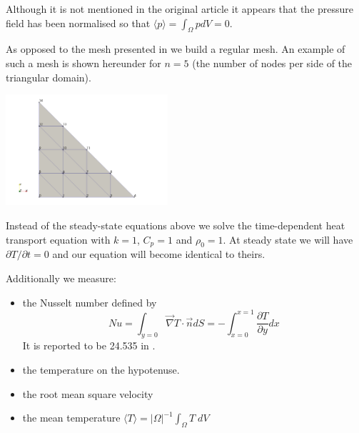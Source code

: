 Although it is not mentioned in the original article it appears that the 
pressure field has been normalised so that $\langle p \rangle = \int_\Omega p dV=0$.

As opposed to the mesh presented in \cite{jolm17} we build a regular mesh.
An example of such a mesh is shown hereunder for $n=5$ (the number of nodes
per side of the triangular domain). 
\begin{center}
\includegraphics[width=6cm]{python_codes/fieldstone_51/images/minigrid5}
\end{center}

Instead of the steady-state equations above we solve the time-dependent 
heat transport equation with $k=1$, $C_p=1$ and $\rho_0=1$. At steady state 
we will have $\partial T/\partial t=0$ and our equation will become identical 
to theirs. 

Additionally we measure:
\begin{itemize}
\item the Nusselt number defined by 
\[
Nu
=\int_{y=0} \vec{\nabla}T \cdot \vec{n} dS  
=-\int_{x=0}^{x=1} \frac{\partial T}{\partial y} dx 
\]
It is reported to be 24.535 in \cite{jolm17}.
\item the temperature on the hypotenuse.
\item the root mean square velocity
\item the mean temperature $\langle T \rangle = |\Omega|^{-1} \int_\Omega T \; dV$
\end{itemize}


